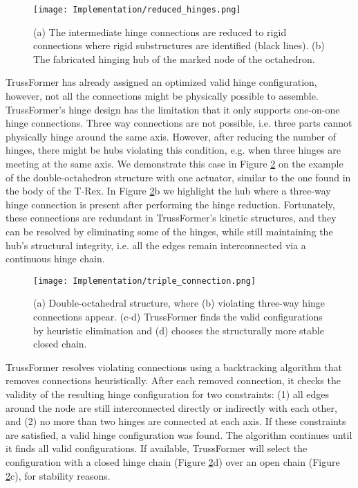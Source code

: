 \begin{figure}[ht!]
    \texttt{[image: Implementation/reduced\_hinges.png]}
    \centering
    \caption{(a) The intermediate hinge connections are reduced to rigid connections where rigid substructures are identified (black lines). (b) The fabricated hinging hub of the marked node of the octahedron.}
    \label{fig:reduced_hinges}
\end{figure}
TrussFormer has already assigned an optimized valid hinge configuration, however, not all the connections might be physically possible to assemble. TrussFormer’s hinge design
has the limitation that it only supports one-on-one hinge connections. Three way connections are not possible, i.e. three parts cannot physically hinge around the same axis.
However, after reducing the number of hinges, there might be hubs violating this condition, e.g. when three hinges are meeting at the same axis. We demonstrate this case in Figure \ref{fig:triple_connection} on the example of the double-octahedron structure with one actuator, similar to the one found in the body of the T-Rex. In Figure \ref{fig:triple_connection}b we highlight the hub where a three-way hinge connection is present after performing the hinge reduction. Fortunately, these connections are redundant in TrussFormer’s kinetic structures, and they can be resolved by eliminating some of the hinges, while still maintaining the hub’s structural integrity, i.e. all the edges remain interconnected via a continuous hinge chain.
\begin{figure}[ht!]
    \texttt{[image: Implementation/triple\_connection.png]}
    \centering
    \caption{(a) Double-octahedral structure, where (b) violating three-way hinge connections appear. (c-d) TrussFormer finds the valid configurations by heuristic elimination and (d) chooses the structurally more stable closed chain.}
    \label{fig:triple_connection}
\end{figure}
TrussFormer resolves violating connections using a backtracking algorithm that removes connections heuristically. After each removed connection, it checks the validity of the resulting hinge configuration for two constraints: (1) all edges around the node are still interconnected directly or indirectly with each other, and (2) no more than two hinges are connected at each axis. If these constraints are satisfied, a valid hinge configuration was found. The algorithm continues until it finds all valid configurations. If available, TrussFormer will select the configuration with a closed hinge chain (Figure \ref{fig:triple_connection}d) over an open chain (Figure \ref{fig:triple_connection}c), for stability reasons.

